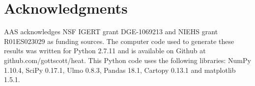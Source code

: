 \documentclass[12pt]{iopart}
\begin{document}
{%
%



%
%
%





\section*{Acknowledgments}
AAS acknowledges NSF IGERT grant DGE-1069213 and NIEHS grant R01ES023029 as funding sources. 
The computer code used to generate these results was written for Python 2.7.11 and is available on Github at github.com/gottscott/heat. This Python code uses  the following libraries: NumPy 1.10.4, SciPy 0.17.1, Ulmo 0.8.3, Pandas 18.1, Cartopy 0.13.1 and matplotlib 1.5.1.


}
\end{document}
